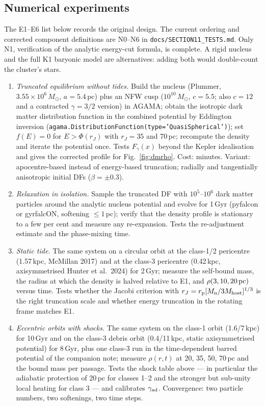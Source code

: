 \documentclass[11pt,a4paper]{article}
\begin{document}
\subsection{Numerical experiments}
The E1--E6 list below records the original design. The current ordering and corrected
component definitions are N0--N6 in \texttt{docs/SECTION11\_TESTS.md}. Only N1, verification
of the analytic energy-cut formula, is complete. A rigid nucleus and the full K1 baryonic
model are alternatives: adding both would double-count the cluster's stars.

\begin{enumerate}[label=E\arabic*.]
\item \emph{Truncated equilibrium without tides.} Build the nucleus (Plummer, $3.55\times10^{6}\,M_\odot$, $a=5.4$\,pc) plus an NFW cusp ($10^{10}\,M_\odot$, $c=5.5$; also $c=12$ and a contracted $\gamma=3/2$ version) in AGAMA; obtain the isotropic dark matter distribution function in the combined potential by Eddington inversion (\texttt{agama.DistributionFunction(type='QuasiSpherical')}); set $f(E)=0$ for $E>\Phi(r_J)$ with $r_J=35$ and 70\,pc; recompute the density and iterate the potential once. Tests $F_\gamma(x)$ beyond the Kepler idealisation and gives the corrected profile for Fig.~\ref{fig:dmrho}. Cost: minutes. Variant: apocentre-based instead of energy-based truncation; radially and tangentially anisotropic initial DFs ($\beta=\pm0.3$).
\item \emph{Relaxation in isolation.} Sample the truncated DF with $10^{5}$--$10^{6}$ dark matter particles around the analytic nucleus potential and evolve for 1\,Gyr (pyfalcon or gyrfalcON, softening $\le1$\,pc); verify that the density profile is stationary to a few per cent and measure any re-expansion. Tests the re-adjustment estimate and the phase-mixing time.
\item \emph{Static tide.} The same system on a circular orbit at the class-1/2 pericentre (1.57\,kpc, McMillan 2017) and at the class-3 pericentre (0.42\,kpc, axisymmetrised Hunter et al.\ 2024) for 2\,Gyr; measure the self-bound mass, the radius at which the density is halved relative to E1, and $\rho(3,10,20\,{\rm pc})$ versus time. Tests whether the Jacobi criterion with $r_J=r_{\rm p}[M_{\rm n}/3M_{\rm host}]^{1/3}$ is the right truncation scale and whether energy truncation in the rotating frame matches E1.
\item \emph{Eccentric orbits with shocks.} The same system on the class-1 orbit (1.6/7\,kpc) for 10\,Gyr and on the class-3 debris orbit (0.4/11\,kpc, static axisymmetrised potential) for 8\,Gyr, plus one class-3 run in the time-dependent barred potential of the companion note; measure $\rho(r,t)$ at 20, 35, 50, 70\,pc and the bound mass per passage. Tests the shock table above --- in particular the adiabatic protection of 20\,pc for classes 1--2 and the stronger but sub-unity local heating for class 3 --- and calibrates $\gamma_{\rm ad}$. Convergence: two particle numbers, two softenings, two time steps.

\end{enumerate}
\end{document}
